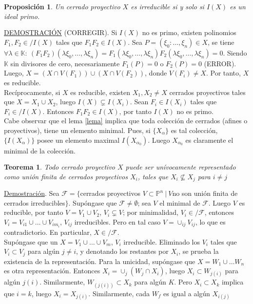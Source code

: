 \documentclass[12pt,a4paper]{report}
\newcommand{\noin}{\in \!\!\!\!\! / }
\newcommand{\ep}{\mathbb{P}^{n}}
\newcommand{\K}{\mathbb{K}}
\newcommand{\F}{\mathscr{F}}
\newtheorem{teo}{Teorema}[chapter]
\newtheorem{prop}{Proposición}[chapter]
\begin{document}
\begin{prop}
	Un cerrado proyectivo $X$ es irreducible si y solo si $I(X)$ es un ideal primo.
\end{prop}
\underline{DEMOSTRACIÓN} (CORREGIR). Si $I(X)$ no es primo, existen polinomios $F_{1},F_{2} \noin I(X) $ tales que $F_{1}F_{2} \in I(X)$. Sea $P=(\xi_{0}: \ldots, \xi_{n}) \in X $, se tiene  $ \forall \lambda \in \K: \: (F_{1}F_{2}) (\lambda\xi_{0}, \ldots , \lambda \xi_{n})= F_{1} (\lambda\xi_{0}, \ldots , \lambda \xi_{n})F_{2} (\lambda\xi_{0}, \ldots , \lambda \xi_{n})= 0$. Siendo $\K$ sin divisores de cero, necesariamente $F_{1}(P)=0$ o $F_{2}(P)=0$ (ERROR). Luego, $X= (X \cap V(F_{1})) \cup (X \cap V(F_{2})) $, donde $V(F_{i}) \neq X$. Por tanto, $X$ es reducible.\\
Recíprocamente, si $X$ es reducible, existen $X_{1}, X_{2} \neq X$ cerrados proyectivos tales que $ X = X_{1} \cup X_{2}$, luego $I(X) \subsetneq I(X_{i})$. Sean $F_{i}\in I(X_{i})$ tales que $F_{i} \noin  I(X)$. Entonces $F_{1}F_{2}\in I(X)$, por tanto $I(X)$ no es primo.\\

Cabe observar que el lema \ref{lema} implica que toda colección de cerrados (afines o proyectivos), tiene un elemento minimal. Pues, si $\{X_{\alpha}\}$ es tal colección, $\{I(X_{\alpha})\}$ posee un elemento maximal $I(X_{\alpha_{0}})$. Luego $X_{\alpha_{0}}$ es claramente el minimal de la colección. \\

\begin{teo}
	Todo cerrado proyectivo $X$ puede ser unívocamente representado como unión finita de cerrados proyectivos $X_{i}$, tales que $X_{i} \nsubseteq X_{j}$ para $i \neq j$
\end{teo}

\underline{Demostración}. Sea $\F = \{ $cerrados proyectivos $V \subset \ep  \: | \: V $no son unión finita de cerrados irreducibles$\}$. Supóngase que $\F \neq \emptyset$; sea $V$ el minimal de $\F$. Luego $V$ es reducible, por tanto $V=V_{1} \cup V_{2}$, $V_{i} \subsetneq V$; por minimalidad, $V_{i}\noin \F$, entonces $V_{i}= V_{i1} \cup \ldots \cup V_{im_{i}} $, $V_{ij}$ irreducibles. Pero en tal caso $V=\cup _{ij} V_{ij}$, lo que es contradictorio. En particular, $X \noin\F $. \\
Supóngase que un $X = V_{1} \cup \ldots \cup V_{m}$, $V_{i}$ irreducible. Eliminado los $V_{i}$ tales que $V_{i} \subset V_{j}$ para algún $j \neq i$, y denotando los restantes por $X_{i}$, se prueba la existencia de la representación. Para la unicidad, supóngase que $X=W_{1} \cup \ldots W_{n}$ es otra representación. Entonces $X_{i} = \cup _{j} (W_{j}\cap X_{i})$, luego $X_{i}\subset W_{j(i)}$ para algún $j(i)$. Similarmente, $W_{(j(i))} \subset X_{k}$ para algún $K$. Pero $X_{i} \subset X_{{k}}$ implica que $i=k$, luego $X_{i}= X_{j(i)}$. Similarmente, cada $W_{f}$ es igual a algún $X_{i(j)}$\\
\end{document}
